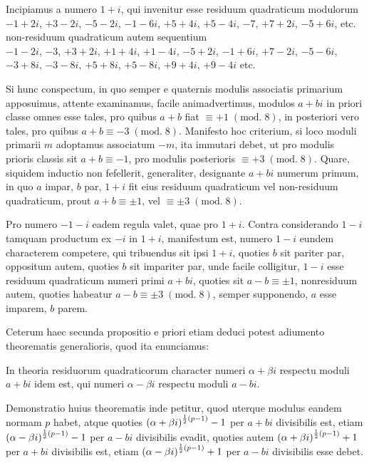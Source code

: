 \documentclass[twoside,12pt]{memoir}
\renewcommand{\pmod}[1]{\;(\textrm{mod.}\;#1)}
\let\oldfrac\frac
\def\frac#1#2{\mathchoice{\tfrac{#1}{#2}}{\oldfrac{#1}{#2}}{\genfrac{}{}{}{2}{#1}{#2\mathstrut}}{\genfrac{}{}{}{3}{#1}{#2\mathstrut}}}
\begin{document}
Incipiamus a numero \(1+i\), qui invenitur esse residuum quadraticum modulorum\\
\(-1+2 i\), \(+3-2 i\), \(-5-2 i\), \(-1-6 i\), \(+5+4 i\), \(+5-4 i\), \(-7\), \(+7+2 i\), \(-5+6 i\), etc.\\
non-residuum quadraticum autem sequentium\\
\(-1-2 i\), \(-3\), \(+3+2 i\), \(+1+4 i\), \(+1-4 i\), \(-5+2 i\), \(-1+6 i\), \(+7-2 i\), \(-5-6 i\), \(-3+8 i\), \(-3-8 i\), \(+5+8 i\), \(+5-8 i\), \(+9+4 i\), \(+9-4 i\) etc.

Si hunc conspectum, in quo semper e quaternis modulis associatis primarium apposuimus, attente examinamus, facile animadvertimus, modulos \(a+b i\) in priori classe omnes esse tales, pro quibus \(a+b\) fiat \(\equiv+1\pmod{8}\), in posteriori vero tales, pro quibus \(a+b \equiv-3\pmod{8}\). Manifesto hoc criterium, si loco moduli primarii \(m\) adoptamus associatum \(-m\), ita immutari debet, ut pro modulis prioris classis sit \(a+b \equiv-1\), pro modulis posterioris \(\equiv+3\pmod{8}\). Quare, siquidem inductio non fefellerit, generaliter, designante \(a+b i\) numerum primum, in quo \(a\) impar, \(b\) par, \(1+i\) fit eius residuum quadraticum vel non-residuum quadraticum, prout \(a+b \equiv \pm 1\), vel \(\equiv \pm 3\pmod{8}\).

Pro numero \(-1-i\) eadem regula valet, quae pro \(1+i\). Contra considerando \(1-i\) tamquam productum ex \(-i\) in \(1+i\), manifestum est, numero \(1-i\) eundem characterem competere, qui tribuendus sit ipsi \(1+i\), quoties \(b\) sit pariter par, oppositum autem, quoties \(b\) sit impariter par, unde facile colligitur, \(1-i\) esse residuum quadraticum numeri primi \(a+b i\), quoties sit \(a-b \equiv \pm 1\), nonresiduum autem, quoties habeatur \(a-b \equiv \pm 3\pmod{8}\), semper supponendo, \(a\) esse imparem, \(b\) parem.

Ceterum haec secunda propositio e priori etiam deduci potest adiumento theorematis generalioris, quod ita enunciamus:\pagebreak%
 
In theoria residuorum quadraticorum character numeri \(\alpha+\beta i\) respectu moduli \(a+b i\) idem est, qui numeri \(\alpha-\beta i\) respectu moduli \(a-b i\).
 
Demonstratio huius theorematis inde petitur, quod uterque modulus eandem normam \(p\) habet, atque quoties \((\alpha+\beta i)^{\frac{1}{2}(p-1)}-1\) per \(a+b i\) divisibilis est, etiam \((\alpha-\beta i)^{\frac{1}{2}(p-1)}-1\) per \(a-b i\) divisibilis evadit, quoties autem \((\alpha+\beta i)^{\frac{1}{2}(p-1)}+1\) per \(a+b i\) divisibilis est, etiam \((\alpha-\beta i)^{\frac{1}{2}(p-1)}+1\) per \(a-b i\) divisibilis esse debet.
\end{document}
